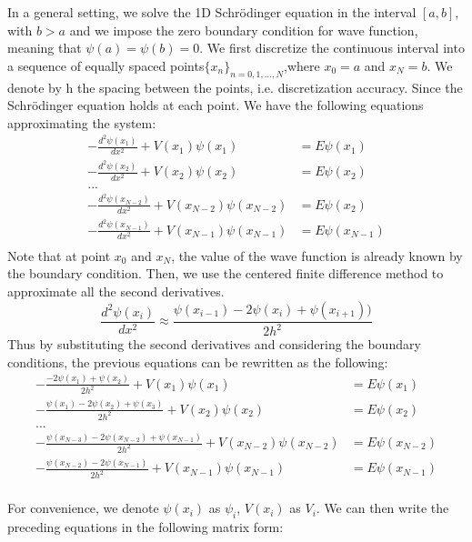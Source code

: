 In a general setting, we solve the 1D Schr\"{o}dinger equation in the interval $[a,b]$, with $b > a$ and we impose the zero boundary condition for wave function, meaning that $\psi(a) = \psi(b) = 0$. 
We first discretize the continuous interval into a sequence of equally spaced points$\{x_n\}_{n = 0,1,...,N}$,where $x_0 = a$ and $x_N = b$. We denote by h the spacing between the points, i.e. discretization accuracy. Since the Schr\"{o}dinger equation holds at each point. 
We have the following equations approximating the system: 
\begin{align*} \label{eq:2}
 -\frac{d^2\psi(x_1)}{dx^2}+V(x_1)\psi(x_1)&= E\psi(x_1)  \\ 
-\frac{d^2\psi(x_2)}{dx^2}+V(x_2)\psi(x_2)&= E\psi(x_2) \\
...\\
-\frac{d^2\psi(x_{N-2})}{dx^2}+V(x_{N-2})\psi(x_{N-2})&= E\psi(x_2)\\
-\frac{d^2\psi(x_{N-1})}{dx^2}+V(x_{N-1})\psi(x_{N-1})&= E\psi(x_{N-1})\\
\end{align*}
Note that at point $x_0$ and $x_N$, the value of the wave function is already known by the boundary condition. 
Then, we use the centered finite difference method to approximate all the second derivatives. 
\begin{equation} \label{eq:3}
\frac{d^2\psi(x_i)}{dx^2} \approx \frac{\psi(x_{i-1})-2\psi(x_i)+\psi(x_{i+1}))}{2h^2}
\end{equation}
Thus by substituting the second derivatives and considering the boundary conditions, the previous equations can be rewritten as the following:
\begin{align*} \label{eq:2}
 -\frac{-2\psi(x_1)+\psi(x_{2})}{2h^2}+V(x_1)\psi(x_1)&= E\psi(x_1)  \\ 
-\frac{\psi(x_{1})-2\psi(x_2)+\psi(x_{3})}{2h^2}+V(x_2)\psi(x_2)&= E\psi(x_{2}) \\
...\\
-\frac{\psi(x_{N-3})-2\psi(x_{N-2})+\psi(x_{N-1})}{2h^2}+V(x_{N-2})\psi(x_{N-2})&= E\psi(x_{N-2})\\
-\frac{\psi(x_{N-2})-2\psi(x_{N-1})}{2h^2}+V(x_{N-1})\psi(x_{N-1})&= E\psi(x_{N-1})\\
\end{align*}

For convenience, we denote $\psi(x_i)$ as $\psi_i$, $V(x_i)$ as $V_i$. We can then write the preceding equations in the following matrix form: 

